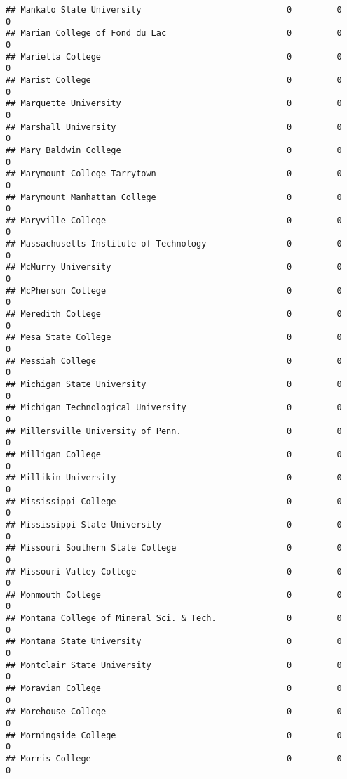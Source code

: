 \documentclass[
]{article}
\begin{document}
\begin{verbatim}
## Mankato State University                             0         0           0
## Marian College of Fond du Lac                        0         0           0
## Marietta College                                     0         0           0
## Marist College                                       0         0           0
## Marquette University                                 0         0           0
## Marshall University                                  0         0           0
## Mary Baldwin College                                 0         0           0
## Marymount College Tarrytown                          0         0           0
## Marymount Manhattan College                          0         0           0
## Maryville College                                    0         0           0
## Massachusetts Institute of Technology                0         0           0
## McMurry University                                   0         0           0
## McPherson College                                    0         0           0
## Meredith College                                     0         0           0
## Mesa State College                                   0         0           0
## Messiah College                                      0         0           0
## Michigan State University                            0         0           0
## Michigan Technological University                    0         0           0
## Millersville University of Penn.                     0         0           0
## Milligan College                                     0         0           0
## Millikin University                                  0         0           0
## Mississippi College                                  0         0           0
## Mississippi State University                         0         0           0
## Missouri Southern State College                      0         0           0
## Missouri Valley College                              0         0           0
## Monmouth College                                     0         0           0
## Montana College of Mineral Sci. & Tech.              0         0           0
## Montana State University                             0         0           0
## Montclair State University                           0         0           0
## Moravian College                                     0         0           0
## Morehouse College                                    0         0           0
## Morningside College                                  0         0           0
## Morris College                                       0         0           0

\end{verbatim}
\end{document}
